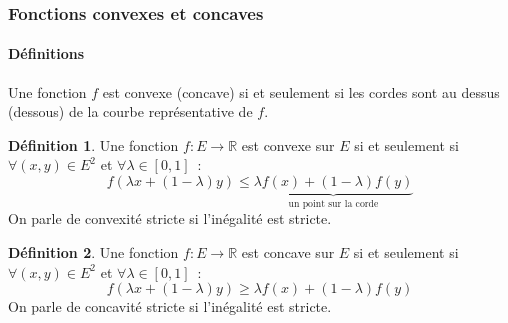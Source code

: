 \documentclass[10pt,notheorems]{beamer}
\theoremstyle{plain}
\theoremstyle{definition} %
\newtheorem{definition}{Définition}
\begin{document}
\begin{frame}
  \frametitle{Fonctions convexes et concaves}
  \framesubtitle{Définitions}
  \hypertarget{slide_fonctions_convexes_1}{}
  \bigskip Une fonction $f$ est convexe (concave) si et seulement si
  les cordes sont au dessus (dessous) de la courbe représentative de
  $f$.

  {\small
  \begin{definition}\label{def:convexe}
    Une fonction $f:E\rightarrow \mathbb R$ est convexe sur $E$ si et seulement si $\forall (x,y)\in E^2$ et $\forall \lambda\in[0,1]$~:
    \[
      f(\lambda x + (1-\lambda)y) \leq \underbrace{\lambda f(x) + (1-\lambda)f(y)}_{\text{un point sur la corde}}
    \]
    On parle de convexité stricte si l'inégalité est stricte.
  \end{definition}

  \begin{definition}\label{def:concave}
    Une fonction $f:E\rightarrow \mathbb R$ est concave sur $E$ si et seulement si $\forall (x,y)\in E^2$ et $\forall \lambda\in[0,1]$~:
    \[
      f(\lambda x + (1-\lambda)y) \geq \lambda f(x) + (1-\lambda)f(y)
    \]
    On parle de concavité stricte si l'inégalité est stricte.
  \end{definition}
}
\end{frame}
\end{document}
